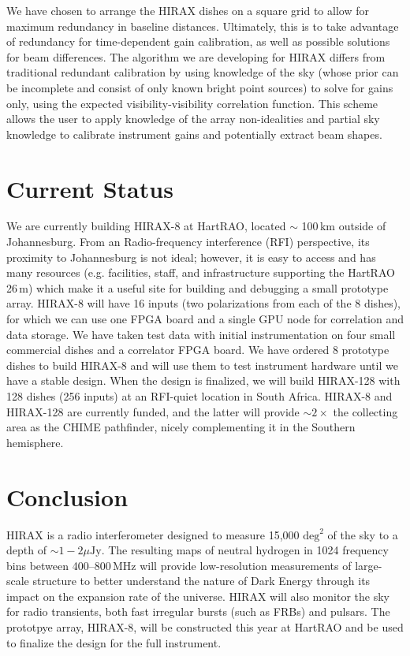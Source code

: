 \documentclass[]{spie}  %
\begin{document}
We have chosen to arrange the HIRAX dishes on a square grid to allow for maximum redundancy in baseline distances. Ultimately, this is to take advantage of redundancy for time-dependent gain calibration, as well as possible solutions for beam differences. The algorithm we are developing for HIRAX \cite{sievers} differs from traditional redundant calibration \cite{2010MNRAS.408.1029L} by using knowledge of the sky (whose prior can be incomplete and consist of only known bright point sources) to solve for gains only, using the expected visibility-visibility correlation function. This scheme allows the user to apply knowledge of the array non-idealities and partial sky knowledge to calibrate instrument gains and potentially extract beam shapes. \newline

\section{Current Status}
\label{sec:current}
We are currently building HIRAX-8 at HartRAO, located $\sim$ 100\,km outside of Johannesburg. From an Radio-frequency interference (RFI) perspective, its proximity to Johannesburg is not ideal; however, it is easy to access and has many resources (e.g. facilities, staff, and infrastructure supporting the HartRAO 26\,m) which make it a useful site for building and debugging a small prototype array. HIRAX-8 will have 16 inputs (two polarizations from each of the 8 dishes), for which we can use one FPGA board and a single GPU node for correlation and data storage. We have taken test data with initial instrumentation on four small commercial dishes and a correlator FPGA board. We have ordered 8 prototype dishes to build HIRAX-8 and will use them to test instrument hardware until we have a stable design. When the design is finalized, we will build HIRAX-128 with 128 dishes (256 inputs) at an RFI-quiet location in South Africa. HIRAX-8 and HIRAX-128 are currently funded, and the latter will provide $\sim2\times$ the collecting area as the CHIME pathfinder, nicely complementing it in the Southern hemisphere. 

\section{Conclusion}

HIRAX is a radio interferometer designed to measure 15,000 $\mathrm{deg}^{2}$ of the sky to a depth of $\sim1-2\mu\mathrm{Jy}$. The resulting maps of neutral hydrogen in 1024 frequency bins between 400--800\,MHz will provide low-resolution measurements of large-scale structure to better understand the nature of Dark Energy through its impact on the expansion rate of the universe. HIRAX will also monitor the sky for radio transients, both fast irregular bursts (such as FRBs) and pulsars. The prototpye array, HIRAX-8, will be constructed this year at HartRAO and be used to finalize the design for the full instrument.
\end{document}
